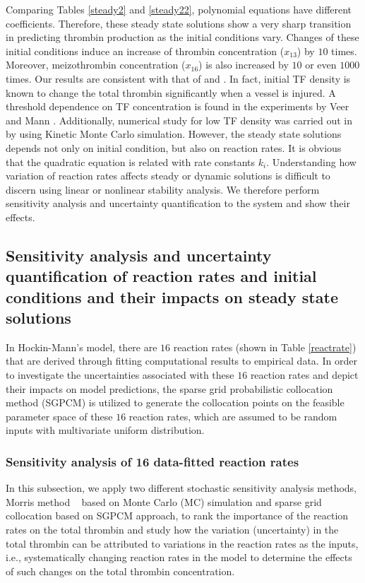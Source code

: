 Comparing Tables \ref{steady2} and \ref{steady22}, polynomial
equations have different coefficients. Therefore, these steady state
solutions show a very sharp transition in predicting thrombin
production as the initial conditions vary. Changes of these initial
conditions induce an increase of thrombin concentration ($x_{13}$)
by $10$ times. Moreover, meizothrombin concentration ($x_{16}$) is
also increased by $10$ or even $1000$ times. Our results are
consistent with that of \cite{KF01} and \cite{LoDen05}. In fact,
initial TF density is known to change the total thrombin
significantly when a vessel is injured. A threshold dependence on TF
concentration is found in the experiments by Veer and Mann
\cite{VM}. Additionally, numerical study for low TF density was
carried out in \cite{LoDen05} by using Kinetic Monte Carlo
simulation. However, the steady state solutions depends not only on
initial condition, but also on reaction rates. It is obvious that
the quadratic equation is related with rate constants $k_i$.
Understanding how variation of reaction rates affects steady or
dynamic solutions is difficult to discern using linear or nonlinear
stability analysis. We therefore perform sensitivity analysis and
uncertainty
quantification to the system and show their effects. %

\subsection*{Sensitivity analysis and uncertainty quantification of
reaction rates and initial conditions and their impacts on steady
state solutions} \label{sec:uq}

In Hockin-Mann's model, there are $16$ reaction rates (shown in
Table \ref{reactrate}) that are derived through fitting
computational results to empirical data.  In order to investigate
the uncertainties associated with these $16$ reaction rates and
depict their impacts on model predictions, the sparse grid
probabilistic collocation method (SGPCM) \cite{DBJSH, LinAMTAWR,
LinAMTJSC} is utilized to generate the collocation points on the
feasible parameter space of these $16$ reaction rates, which are
assumed to be random inputs with multivariate uniform distribution.
\subsubsection*{Sensitivity analysis of 16 data-fitted  reaction rates}
\label{sa}
In this subsection, we apply two different stochastic sensitivity
analysis methods, Morris method ~\cite{Morris91} based on Monte
Carlo (MC) simulation and sparse grid collocation based on SGPCM
approach, to rank the importance of the reaction rates on the total
thrombin and study how the variation (uncertainty) in the total
thrombin can be attributed to variations in the reaction rates as
the inputs, i.e., systematically changing reaction rates in the
model to determine the effects of such changes on the total thrombin
concentration.

